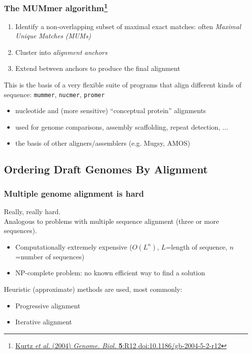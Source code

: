 \begin{frame}
  \frametitle{The MUMmer algorithm\footnote{\tiny{\href{http://dx.doi.org/10.1186/gb-2004-5-2-r12}{Kurtz \textit{et al}. (2004) \textit{Genome. Biol.} \textbf{5}:R12 doi:10.1186/gb-2004-5-2-r12}}}}
  \begin{enumerate}
    \item Identify a non-overlapping subset of maximal exact matches: often \textit{Maximal Unique Matches (MUMs)}
    \item Cluster into \textit{alignment anchors}
    \item Extend between anchors to produce the final alignment
  \end{enumerate}
  This is the basis of a very flexible suite of programs that align different kinds of sequence: \texttt{mummer}, \texttt{nucmer}, \texttt{promer}
  \begin{itemize}
    \item nucleotide and (more sensitive) ``conceptual protein'' alignments
    \item used for genome comparisons, assembly scaffolding, repeat detection, $\ldots$
    \item the basis of other aligners/assemblers (e.g. Mugsy, AMOS)
  \end{itemize}
\end{frame}

\subsection{Ordering Draft Genomes By Alignment}

\begin{frame}
  \frametitle{Multiple genome alignment is hard}
  Really, really hard.\\[0.2cm]
  Analogous to problems with multiple sequence alignment (three or more sequences).
  \begin{itemize}
    \item Computationally extremely expensive ($O(L^n)$, $L$=length of sequence, $n$=number of sequences) 
    \item NP-complete problem: no known efficient way to find a solution
  \end{itemize}
  Heuristic (approximate) methods are used, most commonly:
  \begin{itemize}
    \item Progressive alignment
    \item Iterative alignment
  \end{itemize}
\end{frame}

